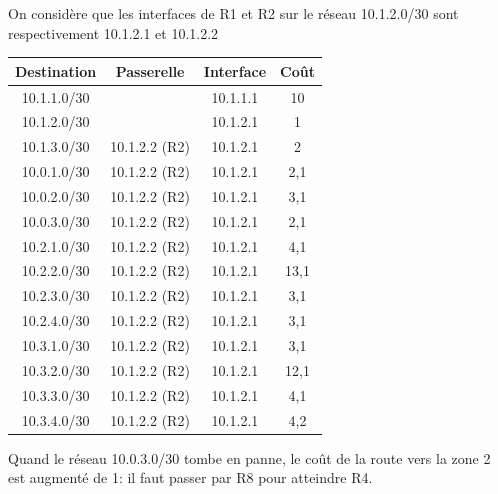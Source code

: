 \documentclass[a4paper,11pt]{article}
\begin{document}
\begin{exo}
\begin{center}
        \label{reseau1}
    \end{center}
    On considère que les interfaces de R1 et R2 sur le réseau 10.1.2.0/30 sont respectivement 10.1.2.1 et 10.1.2.2 
    \begin{center}
        \begin{tabular}{|*{4}{c|}}
            \hline
            Destination & Passerelle & Interface & Coût \\
            \hline
            10.1.1.0/30 &  & 10.1.1.1 & 10 \\
            \hline
            10.1.2.0/30 &  & 10.1.2.1 & 1 \\
            \hline
            10.1.3.0/30 & 10.1.2.2 (R2) & 10.1.2.1 & 2 \\
            \hline
            10.0.1.0/30 & 10.1.2.2 (R2) & 10.1.2.1 & 2,1 \\
            \hline
            10.0.2.0/30 & 10.1.2.2 (R2) & 10.1.2.1 & 3,1 \\
            \hline
            10.0.3.0/30 & 10.1.2.2 (R2) & 10.1.2.1 & 2,1 \\
            \hline
            10.2.1.0/30 & 10.1.2.2 (R2) & 10.1.2.1 & 4,1 \\
            \hline
            10.2.2.0/30 & 10.1.2.2 (R2) & 10.1.2.1 & 13,1 \\
            \hline
            10.2.3.0/30 & 10.1.2.2 (R2) & 10.1.2.1 & 3,1 \\
            \hline
            10.2.4.0/30 & 10.1.2.2 (R2) & 10.1.2.1 & 3,1 \\
            \hline
            10.3.1.0/30 & 10.1.2.2 (R2) & 10.1.2.1 & 3,1 \\
            \hline
            10.3.2.0/30 & 10.1.2.2 (R2) & 10.1.2.1 & 12,1 \\
            \hline
            10.3.3.0/30 & 10.1.2.2 (R2) & 10.1.2.1 & 4,1 \\
            \hline
            10.3.4.0/30 & 10.1.2.2 (R2) & 10.1.2.1 & 4,2 \\
            \hline
        \end{tabular}
    \end{center}
Quand le réseau 10.0.3.0/30 tombe en panne, le coût de la route vers la zone 2 est augmenté de 1: il faut passer par R8 pour atteindre R4.
\end{exo}
\end{document}
